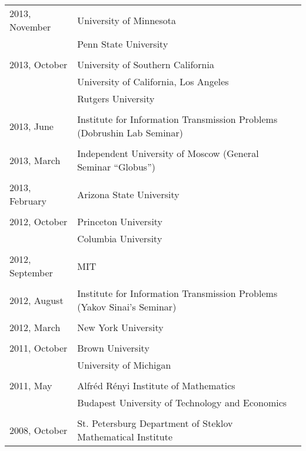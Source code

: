 \documentclass[letterpaper,11pt]{article}
\begin{document}
\begin{longtable}{llc}
	2013, November&
	University of Minnesota \\&
	Penn State University \\\\

	2013, October&
	University of Southern California
	\\&
	University of California, Los Angeles
	\\&Rutgers University\\\\

	2013, June& Institute for Information Transmission Problems
	(Dobrushin Lab Seminar)\\\\

	2013, March& Independent University of Moscow (General Seminar
	``Globus'')\\\\

	2013, February & Arizona State University\\\\

	2012, October & Princeton University \\
	& Columbia University\\\\

	2012, September & MIT \\\\

	2012, August
	& Institute for Information Transmission Problems
	(Yakov Sinai's Seminar)
	\\\\

	2012, March & New York University\\\\

	2011, October & Brown University \\
	&University of Michigan
	\\
	\\
	2011, May& Alfr\'ed R\'enyi Institute of Mathematics
	\\
	& Budapest University of Technology and Economics
	\\\\

	2008, October &
	St. Petersburg Department of Steklov Mathematical
	Institute%
	\\
\end{longtable}
\bigskip
\end{document}
